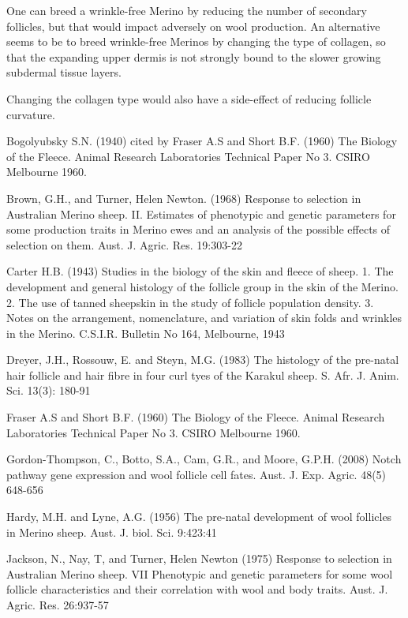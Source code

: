 \documentclass[titlepage]{article}  %
\begin{document}
One can breed a wrinkle-free Merino by reducing the number of secondary follicles, but that would impact adversely on wool production.  An alternative seems to be to breed wrinkle-free Merinos by changing the type of collagen, so that the expanding upper dermis is not strongly bound to the slower growing subdermal tissue layers.

Changing the collagen type would also have a side-effect of reducing follicle curvature.





\clearpage

\begin{thebibliography}{99}

 Bogolyubsky S.N. (1940) cited by Fraser A.S and Short B.F. (1960) The Biology of the Fleece. Animal Research Laboratories Technical Paper No 3. CSIRO Melbourne 1960.

Brown, G.H., and Turner, Helen Newton. (1968) Response to selection in Australian Merino sheep. II. Estimates of phenotypic and genetic parameters for some production traits in Merino ewes and an analysis of the possible effects of selection on them. Aust. J. Agric. Res. 19:303-22

Carter H.B. (1943) Studies in the biology of the skin and fleece of sheep. 1. The development and general histology of the follicle group in the skin of the Merino. 2. The use of tanned sheepskin in the study of follicle population density. 3. Notes on the arrangement, nomenclature, and variation of skin folds and wrinkles in the Merino. C.S.I.R. Bulletin No 164, Melbourne, 1943

Dreyer, J.H., Rossouw, E. and Steyn, M.G. (1983) The histology of the pre-natal hair follicle and hair fibre in four curl tyes of the Karakul sheep.  S. Afr. J. Anim. Sci. 13(3): 180-91

Fraser A.S and Short B.F. (1960) The Biology of the Fleece. Animal Research Laboratories Technical Paper No 3. CSIRO Melbourne 1960.

Gordon-Thompson, C., Botto, S.A., Cam, G.R., and Moore, G.P.H. (2008) Notch pathway gene expression and wool follicle cell fates. Aust. J. Exp. Agric. 48(5) 648-656

Hardy, M.H. and Lyne, A.G. (1956) The pre-natal development of wool follicles in Merino sheep. Aust. J. biol. Sci. 9:423:41

Jackson, N., Nay, T, and Turner, Helen Newton (1975) Response to selection in Australian Merino sheep. VII Phenotypic and genetic parameters for some wool follicle characteristics and their correlation with wool and body traits. Aust. J. Agric. Res. 26:937-57


\end{thebibliography}
\end{document}

